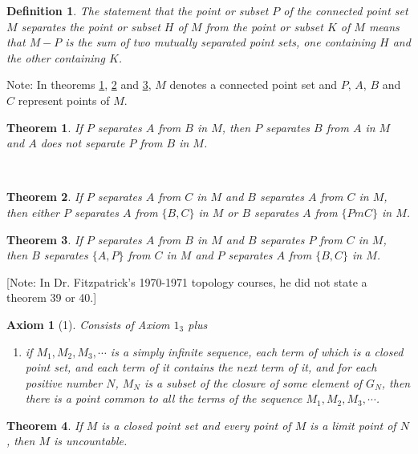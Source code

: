 \documentclass[10pt]{report}
\newtheorem{theorem}{Theorem}
\newtheorem{definition}{Definition}
\newtheorem*{axiom}{Axiom}
\begin{document}
\begin{definition}
 The statement that the point or subset $P$ of the connected point set $M$ separates the point or subset $H$ of $M$ from
the point or subset $K$ of $M$ means that $M-P$ is the sum of two mutually separated point sets, one containing $H$ and
the other containing $K$.
\end{definition}

Note:
 In theorems \ref{T:S1}, \ref{T:S2} and \ref{T:S3}, $M$ denotes a connected point set and $P$, $A$, $B$ and $C$
represent points of $M$.

\begin{theorem}\label{T:S1}If $P$ separates $A$ from $B$ in $M$, then $P$ separates $B$ from $A$ in $M$ and $A$ does not
separate $P$ from $B$ in $M$.
\end{theorem}
\
\begin{theorem}\label{T:S2}If $P$ separates $A$ from $C$ in $M$ and $B$ separates $A$ from $C$ in $M$, then either $P$
separates $A$ from $\{B,C\}$ in $M$ or $B$ separates $A$ from $\{PmC\}$ in $M$.
\end{theorem}

\begin{theorem}\label{T:S3}If $P$ separates $A$ from $B$ in $M$ and $B$ separates $P$ from $C$ in $M$, then $B$
separates
$\{A,P\}$ from $C$ in $M$ and $P$ separates $A$ from $\{B,C\}$ in $M$.
\end{theorem}

[Note: In Dr. Fitzpatrick's 1970-1971 topology courses, he did not state a theorem 39 or 40.]\\

\setcounter{theorem}{40}

\begin{axiom}[1] Consists of Axiom $1_3$ plus
\begin{enumerate}
 \item[4.] if $M_1,M_2,M_3,\cdots$ is a simply infinite sequence, each term of
which is a closed point set, and each term of it contains the next term of it,
and for each positive number $N$, $M_N$ is a subset of the closure of some
element of $G_N$, then there is a point common to all the terms of the sequence
$M_1,M_2,M_3,\cdots$.
\end{enumerate}
\end{axiom}

\begin{theorem}
 If $M$ is a closed point set and every point of $M$ is a limit point of $N$, then $M$ is uncountable.
\end{theorem}
\end{document}

